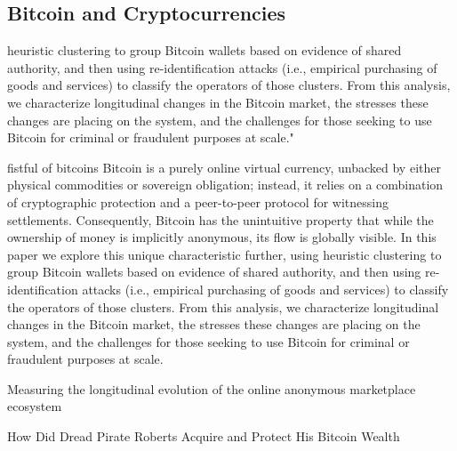 \subsection{Bitcoin and Cryptocurrencies}


 heuristic clustering to group Bitcoin wallets based on evidence of shared authority, and then using re-identification attacks (i.e., empirical purchasing of goods and services) to classify the operators of those clusters. From this analysis, we characterize longitudinal changes in the Bitcoin market, the stresses these changes are placing on the system, and the challenges for those seeking to use Bitcoin for criminal or fraudulent purposes at scale." 
\cite{meiklejohn2013fistful}

fistful of bitcoins
Bitcoin is a purely online virtual currency, unbacked by either physical commodities or sovereign obligation; instead, it relies on a combination of cryptographic protection and a peer-to-peer protocol for witnessing settlements. Consequently, Bitcoin has the unintuitive property that while the ownership of money is implicitly anonymous, its flow is globally visible. In this paper we explore this unique characteristic further, using heuristic clustering to group Bitcoin wallets based on evidence of shared authority, and then using re-identification attacks (i.e., empirical purchasing of goods and services) to classify the operators of those clusters. From this analysis, we characterize longitudinal changes in the Bitcoin market, the stresses these changes are placing on the system, and the challenges for those seeking to use Bitcoin for criminal or fraudulent purposes at scale.

\cite{soska2015measuring}
Measuring the longitudinal evolution of the online anonymous marketplace ecosystem

\cite{ron2014did}
How Did Dread Pirate Roberts Acquire and Protect His Bitcoin Wealth
